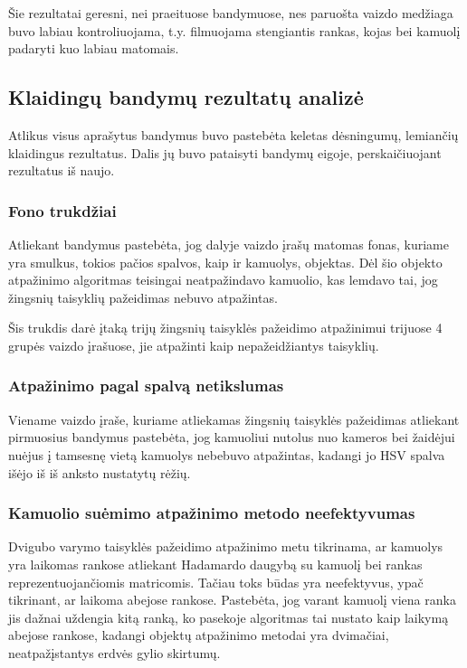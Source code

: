 \documentclass{VUMIFPSbakalaurinis}
\begin{document}
Šie rezultatai geresni, nei praeituose bandymuose, nes paruošta vaizdo medžiaga buvo labiau kontroliuojama, t.y. filmuojama stengiantis rankas, kojas bei kamuolį padaryti kuo labiau matomais.

\subsection{Klaidingų bandymų rezultatų analizė}

Atlikus visus aprašytus bandymus buvo pastebėta keletas dėsningumų, lemiančių klaidingus rezultatus. Dalis jų buvo pataisyti bandymų eigoje, perskaičiuojant rezultatus iš naujo.

\subsubsection{Fono trukdžiai}

Atliekant bandymus pastebėta, jog dalyje vaizdo įrašų matomas fonas, kuriame yra smulkus, tokios pačios spalvos, kaip ir kamuolys, objektas. Dėl šio objekto atpažinimo algoritmas teisingai neatpažindavo kamuolio, kas lemdavo tai, jog žingsnių taisyklių pažeidimas nebuvo atpažintas. 

Šis trukdis darė įtaką trijų žingsnių taisyklės pažeidimo atpažinimui trijuose 4 grupės vaizdo įrašuose, jie atpažinti kaip nepažeidžiantys taisyklių. 

\subsubsection{Atpažinimo pagal spalvą netikslumas}

Viename vaizdo įraše, kuriame atliekamas žingsnių taisyklės pažeidimas atliekant pirmuosius bandymus pastebėta, jog kamuoliui nutolus nuo kameros bei žaidėjui nuėjus į tamsesnę vietą kamuolys nebebuvo atpažintas, kadangi jo HSV spalva išėjo iš iš anksto nustatytų rėžių.  

\subsubsection{Kamuolio suėmimo atpažinimo metodo neefektyvumas}

Dvigubo varymo taisyklės pažeidimo atpažinimo metu tikrinama, ar kamuolys yra laikomas rankose atliekant Hadamardo daugybą su kamuolį bei rankas reprezentuojančiomis matricomis. Tačiau toks būdas yra neefektyvus, ypač tikrinant, ar laikoma abejose rankose. Pastebėta, jog varant kamuolį viena ranka jis dažnai uždengia kitą ranką, ko pasekoje algoritmas tai nustato kaip laikymą abejose rankose, kadangi objektų atpažinimo metodai yra dvimačiai, neatpažįstantys erdvės gylio skirtumų.
\end{document}
